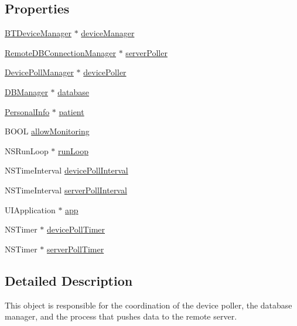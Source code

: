 \subsection*{Properties}
\begin{DoxyCompactItemize}
\item 
\hyperlink{interface_b_t_device_manager}{B\-T\-Device\-Manager} $\ast$ \hyperlink{interface_background_scheduler_aea6a288ffb185db815ddaeaf58c2edcd}{device\-Manager}
\item 
\hyperlink{interface_remote_d_b_connection_manager}{Remote\-D\-B\-Connection\-Manager} $\ast$ \hyperlink{interface_background_scheduler_a6dd785826954ce8d6adc2ad76284c458}{server\-Poller}
\item 
\hyperlink{interface_device_poll_manager}{Device\-Poll\-Manager} $\ast$ \hyperlink{interface_background_scheduler_a9f8103a5d35ba76fd32b5f0d3a2d5517}{device\-Poller}
\item 
\hyperlink{interface_d_b_manager}{D\-B\-Manager} $\ast$ \hyperlink{interface_background_scheduler_a6cacd8a0d6d25475816490b39dcf35d3}{database}
\item 
\hyperlink{interface_personal_info}{Personal\-Info} $\ast$ \hyperlink{interface_background_scheduler_a3f2d5c8d892ff5c8155305ae6bc2da1a}{patient}
\item 
B\-O\-O\-L \hyperlink{interface_background_scheduler_a5209bb2a1aa5fe8eeac8f89977252df7}{allow\-Monitoring}
\item 
N\-S\-Run\-Loop $\ast$ \hyperlink{interface_background_scheduler_a73f120ac0977837ac4a4095ad96d01ec}{run\-Loop}
\item 
N\-S\-Time\-Interval \hyperlink{interface_background_scheduler_ae2e25ad686446576c71a500b66f31e25}{device\-Poll\-Interval}
\item 
N\-S\-Time\-Interval \hyperlink{interface_background_scheduler_a6a4ebd391d86c9779122136b6c4dfc1c}{server\-Poll\-Interval}
\item 
U\-I\-Application $\ast$ \hyperlink{interface_background_scheduler_a8c133b6375de7c3e0cda3ac605ad2029}{app}
\item 
N\-S\-Timer $\ast$ \hyperlink{interface_background_scheduler_a9dee3016296e3a529451c25b426b8923}{device\-Poll\-Timer}
\item 
N\-S\-Timer $\ast$ \hyperlink{interface_background_scheduler_ab78e335cbdbd2c276c299380a982f0e4}{server\-Poll\-Timer}
\end{DoxyCompactItemize}


\subsection{Detailed Description}
This object is responsible for the coordination of the device poller, the database manager, and the process that pushes data to the remote server. 

